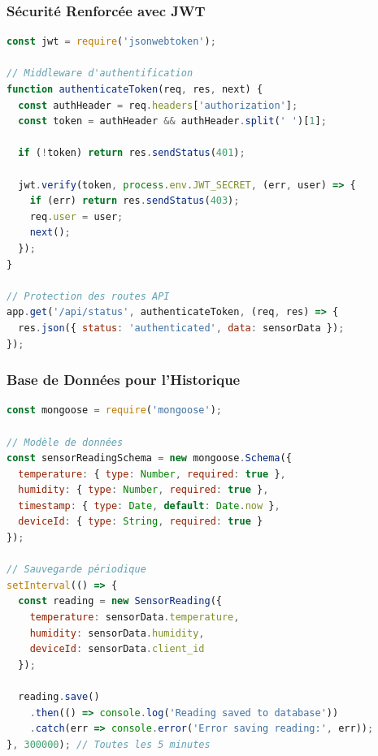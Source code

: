 \documentclass[12pt,a4paper]{article}
\begin{document}
\subsubsection{Sécurité Renforcée avec JWT}
\begin{lstlisting}[language=javascript, caption=Authentification JWT côté serveur]
const jwt = require('jsonwebtoken');

// Middleware d'authentification
function authenticateToken(req, res, next) {
  const authHeader = req.headers['authorization'];
  const token = authHeader && authHeader.split(' ')[1];
  
  if (!token) return res.sendStatus(401);
  
  jwt.verify(token, process.env.JWT_SECRET, (err, user) => {
    if (err) return res.sendStatus(403);
    req.user = user;
    next();
  });
}

// Protection des routes API
app.get('/api/status', authenticateToken, (req, res) => {
  res.json({ status: 'authenticated', data: sensorData });
});
\end{lstlisting}

\subsubsection{Base de Données pour l'Historique}
\begin{lstlisting}[language=javascript, caption=Intégration MongoDB]
const mongoose = require('mongoose');

// Modèle de données
const sensorReadingSchema = new mongoose.Schema({
  temperature: { type: Number, required: true },
  humidity: { type: Number, required: true },
  timestamp: { type: Date, default: Date.now },
  deviceId: { type: String, required: true }
});

// Sauvegarde périodique
setInterval(() => {
  const reading = new SensorReading({
    temperature: sensorData.temperature,
    humidity: sensorData.humidity,
    deviceId: sensorData.client_id
  });
  
  reading.save()
    .then(() => console.log('Reading saved to database'))
    .catch(err => console.error('Error saving reading:', err));
}, 300000); // Toutes les 5 minutes
\end{lstlisting}
\end{document}
